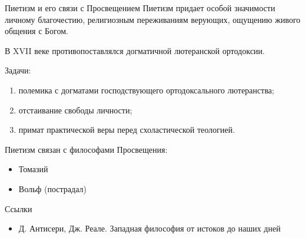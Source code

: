 \documentclass{beamer}
\begin{document}
    \begin{frame}{Пиетизм и его связи с Просвещением}
        Пиетизм придает особой значимости личному благочестию,
        религиозным переживаниям верующих, ощущению живого общения с Богом.

        В XVII веке противопоставлялся догматичной лютеранской ортодоксии.

        Задачи:
        \begin{enumerate}
        \item полемика с догматами господствующего ортодоксального лютеранства;
        \item отстаивание свободы личности;
        \item примат практической веры перед схоластической теологией.
        \end{enumerate}

        Пиетизм связан с философами Просвещения:
        \begin{itemize}
        \item Томазий
        \item Вольф (пострадал)
        \end{itemize}
    \end{frame}

    \begin{frame}{Ссылки}
        \begin{itemize}
        \item Д. Антисери, Дж. Реале.
            Западная философия от истоков до наших дней
        \end{itemize}
    \end{frame}
\end{document}
